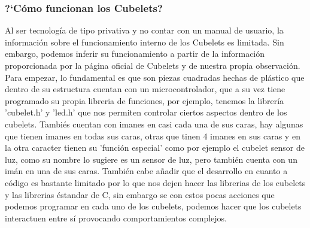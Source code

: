 \subsubsection{?`C\'omo funcionan los Cubelets?}
\label{ssub:comofuncionan}
    Al ser tecnolog\'ia de tipo privativa y no contar con un manual de usuario, la informaci\'on
        sobre el funcionamiento interno de los Cubelets es limitada. Sin embargo, podemos
        inferir su funcionamiento a partir de la informaci\'on proporcionada por la p\'agina
        oficial de Cubelets\cite{modrobotics2023} y de nuestra propia observaci\'on.
    \vskip 0.5cm
    Para empezar, lo fundamental es que son piezas cuadradas hechas de pl\'astico que 
        dentro de su estructura cuentan con un microcontrolador, que a su vez tiene 
        programado su propia libreria de funciones, por ejemplo, tenemos la librer\'ia 
        'cubelet.h' y 'led.h' que nos permiten controlar ciertos aspectos dentro de los cubelets.\cite{modrobotics2012}
    \vskip 0.5cm
    Tambi\'es cuentan con imanes en casi cada una de sus caras, hay algunas que tienen 
        imanes en todas sus caras, otras que tinen 4 imanes en sus caras y en la otra caracter
        tienen su 'funci\'on especial' como por ejemplo el cubelet sensor de luz, como su nombre lo 
        sugiere es un sensor de luz, pero tambi\'en cuenta con un im\'an en una de sus caras.
    \vskip 0.5cm
    Tambi\'en cabe a\~nadir que el desarrollo en cuanto a c\'odigo es bastante limitado por lo que 
        nos dejen hacer las librerias de los cubelets y las librerias \'estandar de C, sin embargo 
        se con estos pocas acciones que podemos programar en cada uno de los cubelets, podemos
        hacer que los cubelets interactuen entre s\'i provocando comportamientos complejos.